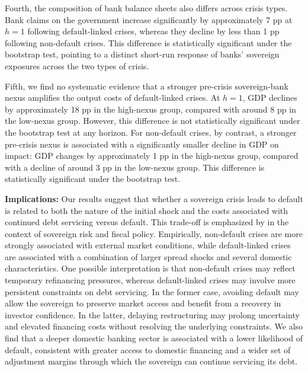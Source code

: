 \documentclass[12pt]{article}
\begin{document}
Fourth, the composition of bank balance sheets also differs across
crisis types. Bank claims on the government increase significantly by
approximately 7 pp at $h=1$ following default-linked crises, whereas
they decline by less than 1 pp following non-default crises. This
difference is statistically significant under the bootstrap test,
pointing to a distinct short-run response of banks' sovereign
exposures across the two types of crisis.

Fifth, we find no systematic evidence that a stronger pre-crisis
sovereign-bank nexus amplifies the output costs of default-linked
crises. At $h=1$, GDP declines by approximately 18 pp in the
high-nexus group, compared with around 8 pp in the low-nexus group.
However, this difference is not statistically significant under the
bootstrap test at any horizon. For non-default crises, by contrast, a
stronger pre-crisis nexus is associated with a significantly smaller
decline in GDP on impact: GDP changes by approximately 1 pp in the
high-nexus group, compared with a decline of around 3 pp in the
low-nexus group. This difference is statistically significant under
the bootstrap test.

\noindent\textbf{Implications:} Our results suggest that whether a
sovereign crisis leads to default is related to both the nature of the
initial shock and the costs associated with continued debt servicing
versus default. This trade-off is emphasized by
\citet{corsetti2013sovereign} in the context of sovereign risk and
fiscal policy. Empirically, non-default crises are more strongly
associated with external market conditions, while default-linked
crises are associated with a combination of larger spread shocks and
several domestic characteristics. One possible interpretation is that
non-default crises may reflect temporary refinancing pressures,
whereas default-linked crises may involve more persistent constraints
on debt servicing. In the former case, avoiding default may allow the
sovereign to preserve market access and benefit from a recovery in
investor confidence. In the latter, delaying restructuring may prolong
uncertainty and elevated financing costs without resolving the
underlying constraints. We also find that a deeper domestic banking
sector is associated with a lower likelihood of default, consistent
with greater access to domestic financing and a wider set of
adjustment margins through which the sovereign can continue servicing
its debt.
\end{document}
